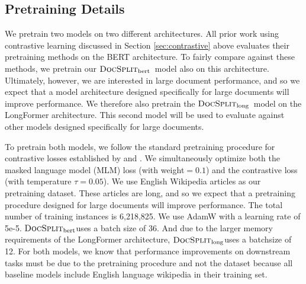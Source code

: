 \documentclass[11pt]{article}
\newcommand{\our}{\mbox{\textsc{DocSplit}}}
\newcommand{\ourbert}{$\our_{\mathrm{bert}}$}
\newcommand{\ourlong}{$\our_{\mathrm{long}}$}
\begin{document}
\subsection{Pretraining Details}

We pretrain two models on two different architectures.
All prior work using contrastive learning discussed in Section \ref{sec:contrastive} above evaluates their pretraining methods on the BERT architecture.
To fairly compare against these methods, we pretrain our \ourbert~model also on this architecture.
Ultimately, however, we are interested in large document performance, and so we expect that a model architecture designed specifically for large documents will improve performance.
We therefore also pretrain the \ourlong~model on the LongFormer architecture.
This second model will be used to evaluate against other models designed specifically for large documents.

To pretrain both models, we follow the standard pretraining procedure for contrastive losses established by \citet{Gao2021SimCSESC} and \citet{Li2022UCTopicUC}.
We simultaneously optimize both the masked language model (MLM) loss (with weight$=0.1$) and the contrastive loss (with temperature $\tau=0.05$).
We use English Wikipedia articles as our pretraining dataset.
These articles are long, and so we expect that a pretraining procedure designed for large documents will improve performance.
The total number of training instances is 6,218,825.
We use AdamW \cite{Kingma2014AdamAM} with a learning rate of 5e-5.
\ourbert uses a batch size of 36.
And due to the larger memory requirements of the LongFormer architecture,
\ourlong uses a batchsize of 12.
For both models, we know that performance improvements on downstream tasks must be due to the pretraining procedure and not the dataset because all baseline models include English language wikipedia in their training set.

%
%
%
\end{document}
